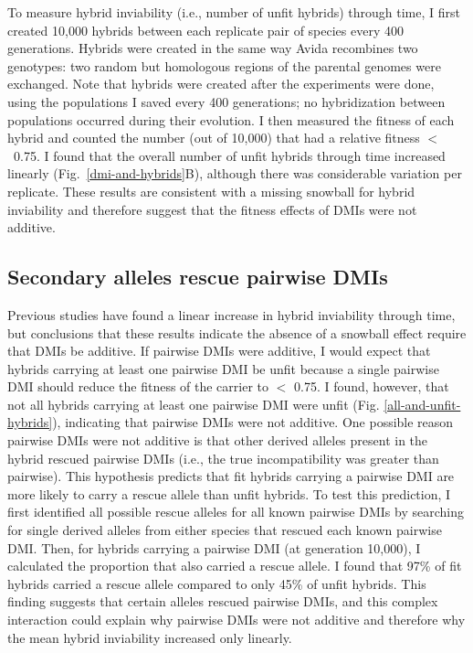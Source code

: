 \begin{doublespace}
To measure hybrid inviability (i.e., number of unfit hybrids) through time,
I first created 10,000 hybrids between each replicate pair of species
every 400 generations.
%
Hybrids were created in the same way Avida recombines two genotypes:
two random but homologous regions of the parental genomes were exchanged.
%
Note that hybrids were created after the experiments were done,
using the populations I saved every 400 generations;
no hybridization between populations occurred during their evolution.
%
I then measured the fitness of each hybrid and counted the number
(out of 10,000) that had a relative fitness $<$~0.75.
%
I found that the overall number of unfit hybrids through time
increased linearly (Fig.~\ref{dmi-and-hybrids}B),
although there was considerable variation per replicate.
%
These results are consistent with a missing snowball for hybrid inviability
and therefore suggest that the fitness effects of DMIs were not additive.



\subsection{Secondary alleles rescue pairwise DMIs}

Previous studies have found a linear increase
in hybrid inviability through time,
but conclusions that these results indicate the absence
of a snowball effect require that DMIs be additive.
%
If pairwise DMIs were additive, I would expect that hybrids
carrying at least one pairwise DMI be unfit
because a single pairwise DMI should reduce
the fitness of the carrier to $<$ 0.75.
%
I found, however, that not all hybrids
carrying at least one pairwise DMI were unfit
(Fig. \ref{all-and-unfit-hybrids}),
indicating that pairwise DMIs were not additive.
%
One possible reason pairwise DMIs were not additive
is that other derived alleles present in the hybrid rescued pairwise DMIs
(i.e., the true incompatibility was greater than pairwise).
%
This hypothesis predicts that fit hybrids carrying a pairwise DMI
are more likely to carry a rescue allele than unfit hybrids.
%
To test this prediction,
I first identified all possible rescue alleles for all known pairwise DMIs
by searching for single derived alleles from either species
that rescued each known pairwise DMI.
%
Then, for hybrids carrying a pairwise DMI (at generation 10,000),
I calculated the proportion that also carried a rescue allele.
%
I found that 97\% of fit hybrids carried a rescue allele
compared to only 45\% of unfit hybrids.
%
This finding suggests that certain alleles rescued pairwise DMIs,
and this complex interaction could explain
why pairwise DMIs were not additive and therefore
why the mean hybrid inviability increased only linearly.




\end{doublespace}
